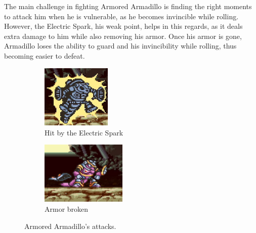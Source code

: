 The main challenge in fighting Armored Armadillo is finding the right moments to attack him when he is vulnerable, as he becomes invincible while rolling. However, the Electric Spark, his weak point, helps in this regards, as it deals extra damage to him while also removing his armor. Once his armor is gone, Armadillo loses the ability to guard and his invincibility while rolling, thus becoming easier to defeat.
\begin{figure}[htp]
	\centering
	\ContinuedFloat
	\begin{subfigure}{0.45\textwidth}
		\centering
		\includegraphics[height=3cm]{figures/X1/Armored_armadillo/Armadillo_shock_1.jpg}
		\caption{Hit by the Electric Spark}
	\end{subfigure}
	\begin{subfigure}{0.45\textwidth}
		\centering
		\includegraphics[height=3cm]{figures/X1/Armored_armadillo/Armadillo_shock_2.jpg}
		\caption{Armor broken}
	\end{subfigure}
	\caption{Armored Armadillo's attacks.}
\end{figure}
